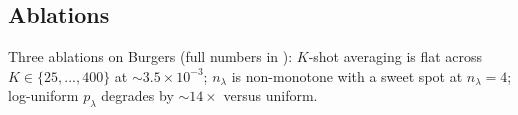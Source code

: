 \subsection{Ablations}
\label{sec:results-ablations}

Three ablations on Burgers (full numbers in
): $K$-shot averaging is flat across
$K\!\in\!\{25,...,400\}$ at $\sim\!3.5\!\times\!10^{-3}$; $n_\lambda$
is non-monotone with a sweet spot at $n_\lambda\!=\!4$; log-uniform
$p_\lambda$ degrades by $\sim\!14\times$ versus uniform.
